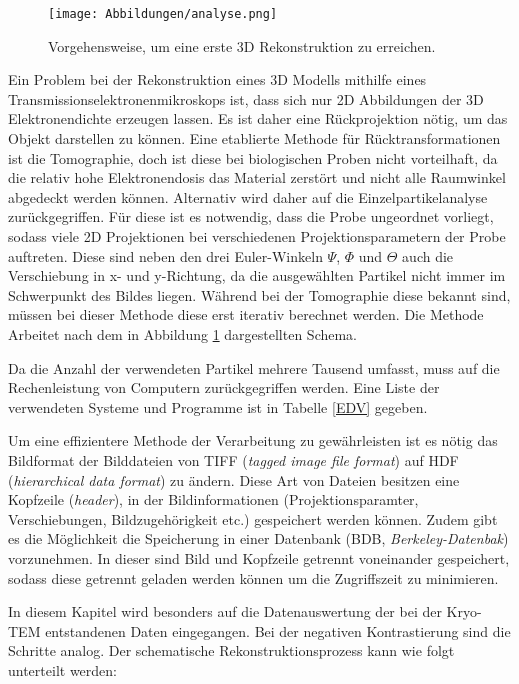 \begin{figure}
	\texttt{[image: Abbildungen/analyse.png]}
	\caption[Vorgehensweise zur ersten 3D Rekonstruktion]{Vorgehensweise, um eine erste 3D Rekonstruktion zu erreichen.}
	\label{vorgehensweise}
\end{figure}


Ein Problem bei der Rekonstruktion eines 3D Modells mithilfe eines Transmissionselektronenmikroskops ist, dass sich nur 2D Abbildungen der 3D Elektronendichte erzeugen lassen.
Es ist daher eine Rückprojektion nötig, um das Objekt darstellen zu können.
Eine etablierte Methode für Rücktransformationen ist die Tomographie, doch ist diese bei biologischen Proben nicht vorteilhaft, da die relativ hohe Elektronendosis das Material zerstört und nicht alle Raumwinkel abgedeckt werden können.
Alternativ wird daher auf die Einzelpartikelanalyse zurückgegriffen.
Für diese ist es notwendig, dass die Probe ungeordnet vorliegt, sodass viele 2D Projektionen bei verschiedenen Projektionsparametern der Probe auftreten.
Diese sind neben den drei Euler-Winkeln $\Psi$, $\Phi$ und $\Theta$ auch die Verschiebung in x- und y-Richtung, da die ausgewählten Partikel nicht immer im Schwerpunkt des Bildes liegen.
Während bei der Tomographie diese bekannt sind, müssen bei dieser Methode diese erst iterativ berechnet werden.
Die Methode Arbeitet nach dem in Abbildung \ref{vorgehensweise} dargestellten Schema.

Da die Anzahl der verwendeten Partikel mehrere Tausend umfasst, muss auf die Rechenleistung von Computern zurückgegriffen werden.
Eine Liste der verwendeten Systeme und Programme ist in Tabelle \ref{EDV} gegeben.

Um eine effizientere Methode der Verarbeitung zu gewährleisten ist es nötig das Bildformat der Bilddateien von TIFF (\textit{tagged image file format}) auf HDF (\textit{hierarchical data format}) zu ändern.
Diese Art von Dateien besitzen eine Kopfzeile (\textit{header}), in der Bildinformationen (Projektionsparamter, Verschiebungen, Bildzugehörigkeit etc.) gespeichert werden können.
Zudem gibt es die Möglichkeit die Speicherung in einer Datenbank (BDB, \textit{Berkeley-Datenbak}) vorzunehmen.
In dieser sind Bild und Kopfzeile getrennt voneinander gespeichert, sodass diese getrennt geladen werden können um die Zugriffszeit zu minimieren.

In diesem Kapitel wird besonders auf die Datenauswertung der bei der Kryo-TEM entstandenen Daten eingegangen.
Bei der negativen Kontrastierung sind die Schritte analog. 
Der schematische Rekonstruktionsprozess kann wie folgt unterteilt werden:


